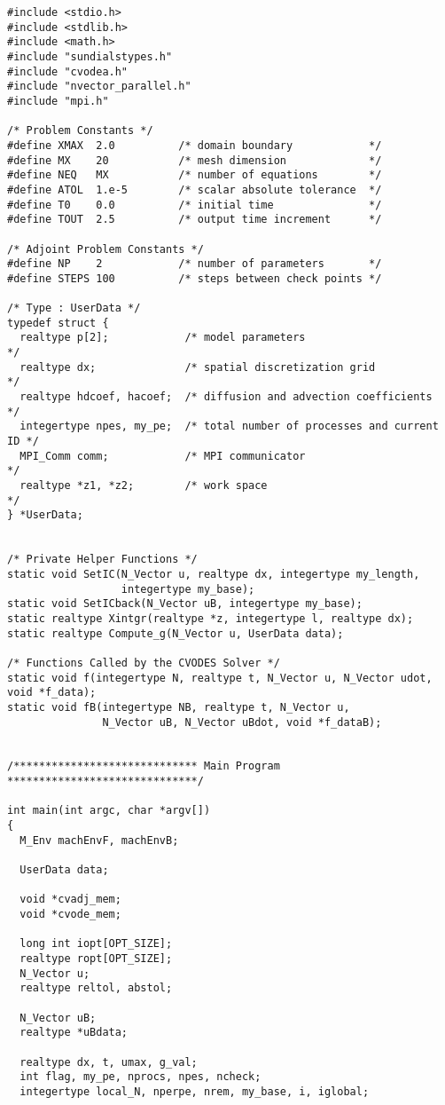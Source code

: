 \begin{verbatim}
#include <stdio.h>
#include <stdlib.h>
#include <math.h>
#include "sundialstypes.h"
#include "cvodea.h"
#include "nvector_parallel.h"
#include "mpi.h"

/* Problem Constants */
#define XMAX  2.0          /* domain boundary            */
#define MX    20           /* mesh dimension             */
#define NEQ   MX           /* number of equations        */
#define ATOL  1.e-5        /* scalar absolute tolerance  */
#define T0    0.0          /* initial time               */
#define TOUT  2.5          /* output time increment      */

/* Adjoint Problem Constants */
#define NP    2            /* number of parameters       */
#define STEPS 100          /* steps between check points */

/* Type : UserData */
typedef struct {
  realtype p[2];            /* model parameters                         */
  realtype dx;              /* spatial discretization grid              */
  realtype hdcoef, hacoef;  /* diffusion and advection coefficients     */
  integertype npes, my_pe;  /* total number of processes and current ID */
  MPI_Comm comm;            /* MPI communicator                         */
  realtype *z1, *z2;        /* work space                               */
} *UserData;


/* Private Helper Functions */
static void SetIC(N_Vector u, realtype dx, integertype my_length, 
                  integertype my_base);
static void SetICback(N_Vector uB, integertype my_base);
static realtype Xintgr(realtype *z, integertype l, realtype dx);
static realtype Compute_g(N_Vector u, UserData data);

/* Functions Called by the CVODES Solver */
static void f(integertype N, realtype t, N_Vector u, N_Vector udot, void *f_data);
static void fB(integertype NB, realtype t, N_Vector u, 
               N_Vector uB, N_Vector uBdot, void *f_dataB);


/***************************** Main Program ******************************/

int main(int argc, char *argv[])
{
  M_Env machEnvF, machEnvB;

  UserData data;

  void *cvadj_mem;
  void *cvode_mem;
  
  long int iopt[OPT_SIZE];
  realtype ropt[OPT_SIZE];
  N_Vector u;
  realtype reltol, abstol;

  N_Vector uB;
  realtype *uBdata;

  realtype dx, t, umax, g_val;
  int flag, my_pe, nprocs, npes, ncheck;
  integertype local_N, nperpe, nrem, my_base, i, iglobal;


\end{verbatim}
